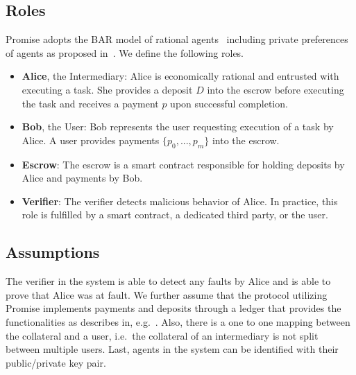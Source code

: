 \documentclass[runningheads]{llncs}
\newcommand{\sys}{Promise\xspace}
\newcommand{\rk}[1]{\todo[linecolor=red,backgroundcolor=red!25,bordercolor=blue,inline,caption={}]{Comment by Rami: #1}}
\newcommand{\dom}[1]{\todo[linecolor=green,backgroundcolor=green!25,bordercolor=green,inline,caption={}]{Comment by Dominik: #1}}
\begin{document}
\subsection{Roles}

\sys adopts the BAR model of rational agents~\cite{aiyer2005bar} including private preferences of agents as proposed in~\cite{Harz2019Balance}.
We define the following roles.

\begin{itemize}
    \item \textbf{Alice}, the Intermediary: Alice is economically rational and entrusted with executing a task. She provides a deposit $D$ into the escrow before executing the task and receives a payment $p$ upon successful completion.
    \item \textbf{Bob}, the User: Bob represents the user requesting execution of a task by Alice. A user provides payments $\{p_0, ..., p_m\}$ into the escrow. %
    \item \textbf{Escrow}: The escrow is a smart contract responsible for holding deposits by Alice and payments by Bob.
    \item \textbf{Verifier}: The verifier detects malicious behavior of Alice. In practice, this role is fulfilled by a smart contract, a dedicated third party, or the user.
\end{itemize}





\subsection{Assumptions}

The verifier in the system is able to detect any faults by Alice and is able to prove that Alice was at fault.
We further assume that the protocol utilizing \sys implements payments and deposits through a ledger that provides the functionalities as describes in, e.g.~\cite{garay2016bitcoin}.
Also, there is a one to one mapping between the collateral and a user, i.e.\ the collateral of an intermediary is not split between multiple users.
Last, agents in the system can be identified with their public/private key pair.
\end{document}
